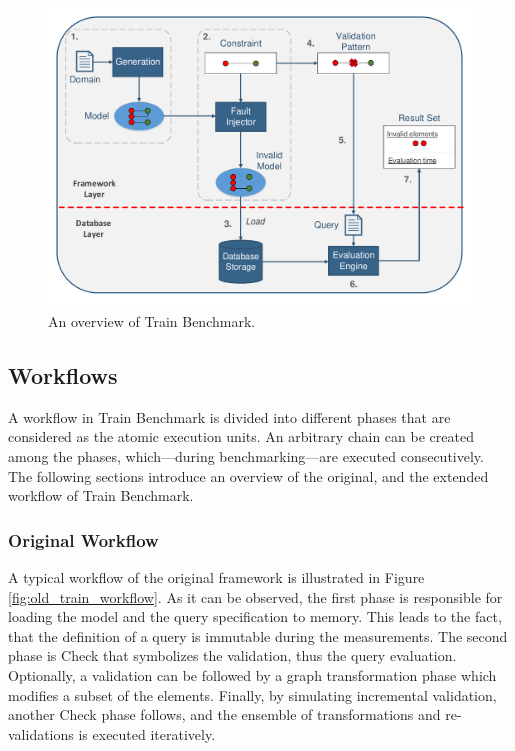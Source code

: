 \begin{figure}[!ht]
	\centering
	\includegraphics[width=150mm, keepaspectratio]{figures/functionality.pdf}
	\caption{An overview of Train Benchmark.}
	\label{fig:functionality}
\end{figure}

\subsection{Workflows}

A workflow in Train Benchmark is divided into different phases that are considered as the atomic execution units. An arbitrary chain can be created among the phases, which---during benchmarking---are executed consecutively. The following sections introduce an overview of the original, and the extended workflow of Train Benchmark.

\subsubsection{Original Workflow}
A typical workflow of the original framework is illustrated in Figure \ref{fig:old_train_workflow}. As it can be observed, the first phase is responsible for loading the model and the query specification to memory. This leads to the fact, that the definition of a query is immutable during the measurements. The second phase is \textsf{Check} that symbolizes the validation, thus the query evaluation. Optionally, a validation can be followed by a graph transformation phase which modifies a subset of the elements. Finally, by simulating incremental validation, another \textsf{Check} phase follows, and the ensemble of transformations and re-validations is executed iteratively.


